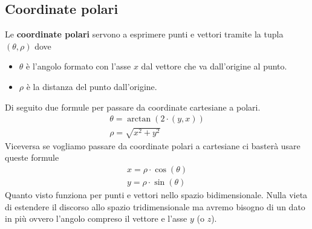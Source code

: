 \subsection{Coordinate polari}
Le \textbf{coordinate polari} servono a esprimere punti e vettori tramite la tupla
$(\theta, \rho)$ dove
\begin{itemize}
	\item $\theta$ \`e l'angolo formato con l'asse $x$ dal vettore che va dall'origine al punto.
	\item $\rho$ \`e la distanza del punto dall'origine.
\end{itemize}
Di seguito due formule per passare da coordinate cartesiane a polari.
\begin{gather*}
	\theta = \arctan(2 \cdot (y, x)) \\
	\rho = \sqrt{x^2 + y^2}
\end{gather*}
Viceversa se vogliamo passare da coordinate polari a cartesiane ci baster\`a usare queste formule
\begin{gather*}
	x = \rho \cdot \cos(\theta) \\
	y = \rho \cdot \sin(\theta)
\end{gather*}
Quanto visto funziona per punti e vettori nello spazio bidimensionale. Nulla vieta di estendere il discorso allo spazio
tridimensionale ma avremo bisogno di un dato in pi\`u ovvero l'angolo compreso il vettore e l'asse $y$ (o $z$).

